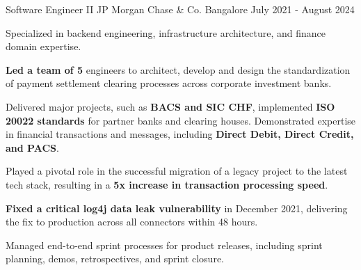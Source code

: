 
\begin{cventries}

  \cventry
    {Software Engineer II} %
    {JP Morgan Chase \& Co.} %
    {Bangalore} %
    {July 2021 - August 2024} %
    {
      \begin{cvitems} %
        \item {Specialized in backend engineering, infrastructure architecture, and finance domain expertise.}
        \item {\textbf{Led a team of 5} engineers to architect, develop and design the standardization of payment settlement clearing processes across corporate investment banks.}
        \item {Delivered major projects, such as \textbf{BACS and SIC CHF}, implemented \textbf{ISO 20022 standards} for partner banks and clearing houses. Demonstrated expertise in financial transactions and messages, including \textbf{Direct Debit, Direct Credit, and PACS}.}
        \item {Played a pivotal role in the successful migration of a legacy project to the latest tech stack, resulting in a \textbf{5x increase in transaction processing speed}.}
        \item {\textbf{Fixed a critical log4j data leak vulnerability} in December 2021, delivering the fix to production across all connectors within 48 hours.}
        \item {Managed end-to-end sprint processes for product releases, including sprint planning, demos, retrospectives, and sprint closure.}
      \end{cvitems}
    }


\end{cventries}
